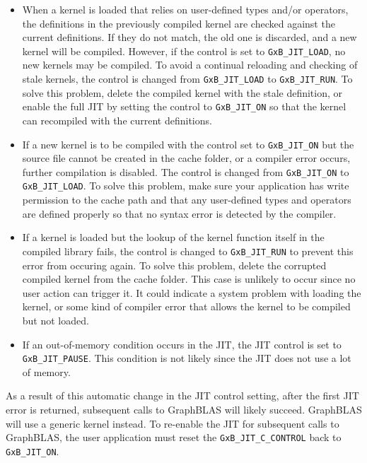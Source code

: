 \begin{itemize}

\item When a kernel is loaded that relies on user-defined types and/or
operators, the definitions in the previously compiled kernel are checked
against the current definitions.  If they do not match, the old one is
discarded, and a new kernel will be compiled.  However, if the control is set
to \verb'GxB_JIT_LOAD', no new kernels may be compiled.  To avoid a continual
reloading and checking of stale kernels, the control is changed from
\verb'GxB_JIT_LOAD' to \verb'GxB_JIT_RUN'.  To solve this problem, delete the
compiled kernel with the stale definition, or enable the full JIT by setting
the control to \verb'GxB_JIT_ON' so that the kernel can recompiled with the
current definitions.

\item If a new kernel is to be compiled with the control set to
\verb'GxB_JIT_ON' but the source file cannot be created in the cache folder, or
a compiler error occurs, further compilation is disabled.  The control is
changed from \verb'GxB_JIT_ON' to \verb'GxB_JIT_LOAD'.
To solve this problem, make sure your application has write permission to the
cache path and that any user-defined types and operators are defined properly
so that no syntax error is detected by the compiler.

\item If a kernel is loaded but the lookup of the kernel function itself in the
compiled library fails, the control is changed to \verb'GxB_JIT_RUN' to prevent
this error from occuring again.  To solve this problem, delete the corrupted
compiled kernel from the cache folder.  This case is unlikely to occur since no
user action can trigger it.  It could indicate a system problem with loading
the kernel, or some kind of compiler error that allows the kernel to be
compiled but not loaded.

\item If an out-of-memory condition occurs in the JIT, the JIT control is
set to \verb'GxB_JIT_PAUSE'.  This condition is not likely since the JIT does
not use a lot of memory.

\end{itemize}

As a result of this automatic change in the JIT control setting, after the
first JIT error is returned, subsequent calls to GraphBLAS will likely succeed.
GraphBLAS will use a generic kernel instead.  To re-enable the JIT for
subsequent calls to GraphBLAS, the user application must reset the
\verb'GxB_JIT_C_CONTROL' back to \verb'GxB_JIT_ON'.

